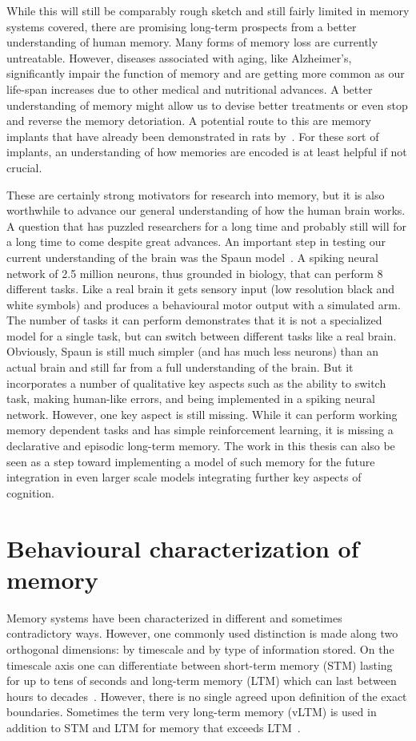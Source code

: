 While this will still be comparably rough sketch and still fairly limited in memory systems covered, there are promising long-term prospects from a better understanding of human memory.
Many forms of memory loss are currently untreatable.
However, diseases associated with aging, like Alzheimer's, significantly impair the function of memory and are getting more common as our life-span increases due to other medical and nutritional advances.
A better understanding of memory might allow us to devise better treatments or even stop and reverse the memory detoriation.
A potential route to this are memory implants that have already been demonstrated in rats by~\textcite{Berger2011}.
For these sort of implants, an understanding of how memories are encoded is at least helpful if not crucial.

These are certainly strong motivators for research into memory, but it is also worthwhile to advance our general understanding of how the human brain works.
A question that has puzzled researchers for a long time and probably still will for a long time to come despite great advances.
An important step in testing our current understanding of the brain was the Spaun model~\parencite{Eliasmith2012}.
A spiking neural network of 2.5 million neurons, thus grounded in biology, that can perform 8 different tasks.
Like a real brain it gets sensory input (low resolution black and white symbols) and produces a behavioural motor output with a simulated arm.
The number of tasks it can perform demonstrates that it is not a specialized model for a single task, but can switch between different tasks like a real brain.
Obviously, Spaun is still much simpler (and has much less neurons) than an actual brain and still far from a full understanding of the brain.
But it incorporates a number of qualitative key aspects such as the ability to switch task, making human-like errors, and being implemented in a spiking neural network.
However, one key aspect is still missing.
While it can perform working memory dependent tasks and has simple reinforcement learning, it is missing a declarative and episodic long-term memory.
The work in this thesis can also be seen as a step toward implementing a model of such memory for the future integration in even larger scale models integrating further key aspects of cognition.


\section{Behavioural characterization of memory}
Memory systems have been characterized in different and sometimes contradictory ways.
However, one commonly used distinction is made along two orthogonal dimensions:
by timescale and by type of information stored.
On the timescale axis one can differentiate between short-term memory (STM) lasting for up to tens of seconds and long-term memory (LTM) which can last between hours to decades~\parencite{chaudhuri2016}.
However, there is no single agreed upon definition of the exact boundaries.
Sometimes the term very long-term memory (vLTM) is used in addition to STM and LTM for memory that exceeds LTM~\parencite{solso1998}.

